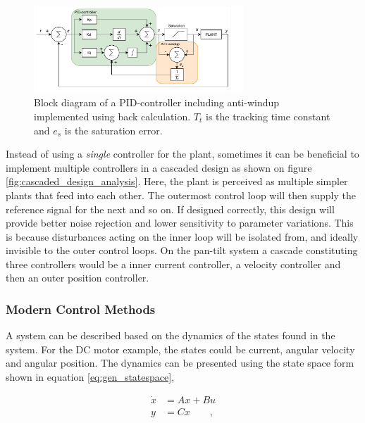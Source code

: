 \documentclass[../../main.tex]{subfiles}
\begin{document}
\begin{figure}
    \centering
    \includegraphics[width=0.7\textwidth]{Sections/Miscellaneous/Images/PID-Anti-windup-BackCalc.pdf}
    \caption{Block diagram of a PID-controller including anti-windup implemented using back calculation. $T_t$ is the tracking time constant and $e_s$ is the saturation error.}
    \label{fig:anti-windup}
\end{figure}

Instead of using a \textit{single} controller for the plant, sometimes it can be beneficial to implement multiple controllers in a cascaded design as shown on figure \ref{fig:cascaded_design_analysis}. Here, the plant is perceived as multiple simpler plants that feed into each other. The outermost control loop will then supply the reference signal for the next and so on. If designed correctly, this design will provide better noise rejection and lower sensitivity to parameter variations. This is because disturbances acting on the inner loop will be isolated from, and ideally invisible to the outer control loops. On the pan-tilt system a cascade constituting three controllers would be a inner current controller, a velocity controller and then an outer position controller.

\subsubsection*{Modern Control Methods}
A system can be described based on the dynamics of the states found in the system. For the DC motor example, the states could be current, angular velocity and angular position. The dynamics can be presented using the state space form shown in equation \ref{eq:gen_statespace},

\begin{equation}\label{eq:gen_statespace}
    \begin{split}
        \Dot{x}&=Ax+Bu \\
        y&=Cx \qquad ,%
    \end{split}
\end{equation}
\end{document}
